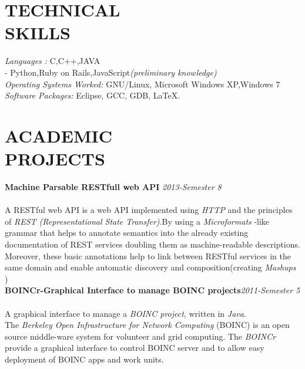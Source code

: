 \documentclass[line,margin]{res}
\begin{document}
\begin{resume}
	  \section{TECHNICAL \\ SKILLS} 
		  {\it Languages :} C,C++,JAVA\\-\hspace{15 mm} Python,Ruby on Rails,JavaScript{\it (preliminary knowledge)}\\
		  {\it Operating Systems Worked:} GNU/Linux, Microsoft Windows XP,Windows 7\\
		  {\it Software Packages:} Eclipse, GCC, GDB, \LaTeX.\\

	  \section{ACADEMIC \\ PROJECTS}
	    	  {\bf Machine Parsable RESTfull web API }\hfill {\it 2013-Semester 8}\\\\
	    	  A RESTful web API is a web API implemented using {\it HTTP }and the principles of {\it REST (Representational State Transfer)}.By using  a {\it Microformats }-like grammar that helps to annotate semantics into the already existing documentation of REST services doubling them as machine-readable descriptions. Moreover, these basic annotations help to link between RESTful services in the same domain and enable automatic discovery and composition(creating {\it Mashups }) \\

                 {\bf BOINCr-Graphical Interface to manage BOINC projects}\hfill {\it 2011-Semester 5}\\\\
	     	 A graphical interface to manage a {\it BOINC project}, written in {\it Java}.\\
	     	 The {\it Berkeley Open Infrastructure for Network Computing }(BOINC) is an open source middle-ware system for volunteer and grid computing. The {\it BOINCr} provide a graphical interface to control BOINC server and to allow easy deployment of BOINC apps and work units.\\	

\end{resume}
\end{document}
